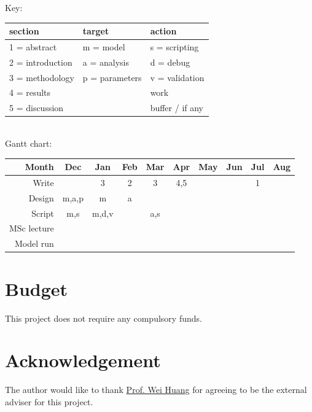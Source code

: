 \documentclass[a4paper, 11pt]{article}
\begin{document}
Key:
\begin{tabular}{lll}
	section & target & action\\\hline
	1 = abstract & m = model & s = scripting\\
	2 = introduction & a = analysis & d = debug\\
	3 = methodology & p = parameters & v = validation\\
	4 = results && \cellcolor{grey90}work\\
	5 = discussion && \cellcolor{lorange}buffer / if any\\
\end{tabular}\\
Gantt chart:
\begin{tabular}{r|ccccccccc}
	Month		&Dec						&Jan						&Feb					&Mar					&Apr					&May				&Jun					&Jul					&Aug				\\\hline
	Write		&							&\cellcolor{grey90}3		&\cellcolor{grey90}2	&\cellcolor{lorange}3	&\cellcolor{grey90}4,5	&\cellcolor{grey90}	&\cellcolor{grey90}		&\cellcolor{grey90}1	&\cellcolor{lorange}\\
	Design		&\cellcolor{grey90}m,a,p	&\cellcolor{grey90}m		&\cellcolor{grey90}a	&\cellcolor{lorange}	&						&					&						&						&					\\
	Script		&\cellcolor{grey90}m,s		&\cellcolor{grey90}m,d,v	&						&\cellcolor{grey90}a,s	&\cellcolor{grey90}		&\cellcolor{grey90}	&\cellcolor{lorange}	&						&					\\
	MSc lecture	&\cellcolor{lorange}		&\cellcolor{lorange}		&\cellcolor{lorange}	&\cellcolor{lorange}	&						&					&						&						&					\\
	Model run 	&							&\cellcolor{grey90}			&\cellcolor{grey90}		&\cellcolor{grey90}		&\cellcolor{grey90}		&\cellcolor{grey90}	&\cellcolor{lorange}	&\cellcolor{lorange}	&\cellcolor{lorange}\\
\end{tabular}
\section{Budget}
This project does not require any compulsory funds.
\clearpage
\section*{Acknowledgement}
The author would like to thank \href{mailto:wei.huang@eng.ox.ac.uk}{Prof. Wei Huang} for agreeing to be the external adviser for this project.
\nocite{*}\printbibliography
\end{document}
